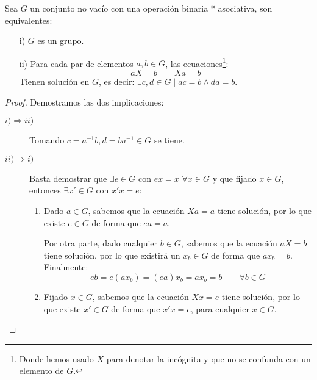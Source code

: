 \begin{prop}
    Sea $G$ un conjunto no vacío con una operación binaria $\ast$ asociativa, son equivalentes:
    \begin{enumerate}
        \item[i)] $G$ es un grupo.
        \item[ii)] Para cada par de elementos $a,b\in G$, las ecuaciones\footnote{Donde hemos usado $X$ para denotar la incógnita y que no se confunda con un elemento de $G$.}:
            \begin{equation*}
                aX = b \qquad Xa = b
            \end{equation*}
            Tienen solución en $G$, es decir: $\exists c,d\in G\mid ac=b \land da = b$.
    \end{enumerate}
    \begin{proof}
        Demostramos las dos implicaciones:
        \begin{description}
            \item [$i)\Rightarrow ii)$] Tomando $c=a^{-1}b,d = ba^{-1}\in G$ se tiene.
            \item [$ii)\Rightarrow i)$] Basta demostrar que $\exists e\in G$ con $ex = x$ $\forall x\in G$ y que fijado $x\in G$, entonces $\exists x'\in G$ con $x'x = e$:

                \begin{enumerate}
                    \item Dado $a\in G$, sabemos que la ecuación $Xa=a$ tiene solución, por lo que existe $e\in G$ de forma que $ea = a$.

                        Por otra parte, dado cualquier $b\in G$, sabemos que la ecuación $aX=b$ tiene solución, por lo que existirá un $x_b\in G$ de forma que $ax_b=b$. Finalmente:
                        \begin{equation*}
                            eb = e(ax_b) = (ea)x_b = ax_b = b \qquad \forall b\in G
                        \end{equation*}
                    \item Fijado $x\in G$, sabemos que la ecuación $Xx=e$ tiene solución, por lo que existe $x'\in G$ de forma que $x'x = e$, para cualquier $x\in G$.
                \end{enumerate}
        \end{description}
    \end{proof}
\end{prop}


